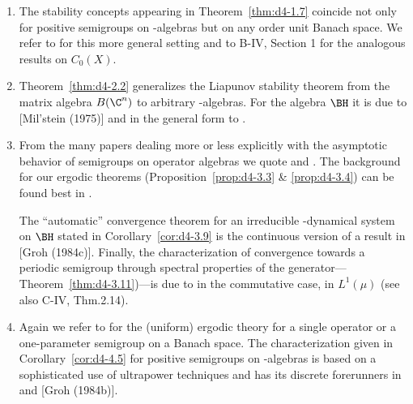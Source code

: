 \begin{enumerate}[label=\emph{Section \arabic*:}, wide]
\item
The stability concepts appearing in Theorem~\ref{thm:d4-1.7} coincide not only for positive semigroups on \CA-algebras but on any order unit Banach space.
We refer to \citet{battyrobinson:1984} for this more general setting and to B-IV, Section 1 for the analogous results on $ C_{0}(X) $.

\item
Theorem~\ref{thm:d4-2.2} generalizes the Liapunov stability theorem from the matrix algebra $ B(\C^{n}) $  to arbitrary \WA-algebras.
For the algebra $ \BH $  it is due to [Mil'stein (1975)] and in the general form to \citet{grohneubrander:1981}.

\item
From the many papers dealing more or less explicitly with the asymptotic behavior of semigroups on operator algebras we quote \citet{frigerioverri:1982} and \citet{watanabe:1982}.
The background for our ergodic theorems (Proposition~\ref{prop:d4-3.3} \& \ref{prop:d4-3.4}) can be found best in \citet{krengel:1985}.

The \enquote{automatic} convergence theorem for an irreducible \WA-dynamical system on $ \BH $  stated in Corollary~\ref{cor:d4-3.9} is the continuous version of a result in [Groh (1984c)].
Finally, the characterization of convergence towards a periodic semigroup through spectral properties of the generator---Theorem~\ref{thm:d4-3.11})---is due to \citet{nagel:1984} in the commutative case, \ie in $ L^{1}(\mu) $ (see also C-IV, Thm.2.14).

\item
Again we refer to \citet{krengel:1985} for the (uniform) ergodic theory for a single operator or a one-parameter semigroup on a Banach space.
The characterization given in Corollary~\ref{cor:d4-4.5} for positive semigroups on \WA-algebras is based on a sophisticated use of ultrapower techniques and has its discrete forerunners in \citet{lotz:1981} and [Groh (1984b)].
\end{enumerate}

